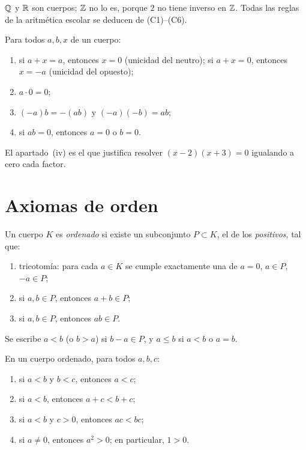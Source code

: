 $\mathbb{Q}$ y $\mathbb{R}$ son cuerpos; $\mathbb{Z}$ no lo es, porque $2$ no tiene inverso en $\mathbb{Z}$. Todas las reglas de la aritmética escolar se deducen de (C1)--(C6).

\begin{proposicion}\label{prop:cuerpo}
Para todos $a,b,x$ de un cuerpo:
\begin{enumerate}
  \item si $a+x=a$, entonces $x=0$ (unicidad del neutro); si $a+x=0$, entonces $x=-a$ (unicidad del opuesto);
  \item $a\cdot 0=0$;
  \item $(-a)b=-(ab)$ y $(-a)(-b)=ab$;
  \item si $ab=0$, entonces $a=0$ o $b=0$.
\end{enumerate}
\end{proposicion}

El apartado~(iv) es el que justifica resolver $(x-2)(x+3)=0$ igualando a cero cada factor.

\section{Axiomas de orden}

\begin{definicion}\label{def:orden}
Un cuerpo $K$ es \emph{ordenado} si existe un subconjunto $P\subset K$, el de los \emph{positivos}, tal que:
\begin{enumerate}[label=(O\arabic*)]
  \item tricotomía: para cada $a\in K$ se cumple exactamente una de $a=0$, $a\in P$, $-a\in P$;
  \item si $a,b\in P$, entonces $a+b\in P$;
  \item si $a,b\in P$, entonces $ab\in P$.
\end{enumerate}
Se escribe $a<b$ (o $b>a$) si $b-a\in P$, y $a\le b$ si $a<b$ o $a=b$.
\end{definicion}

\begin{proposicion}\label{prop:orden}
En un cuerpo ordenado, para todos $a,b,c$:
\begin{enumerate}
  \item si $a<b$ y $b<c$, entonces $a<c$;
  \item si $a<b$, entonces $a+c<b+c$;
  \item si $a<b$ y $c>0$, entonces $ac<bc$;
  \item si $a\neq 0$, entonces $a^2>0$; en particular, $1>0$.
\end{enumerate}
\end{proposicion}

